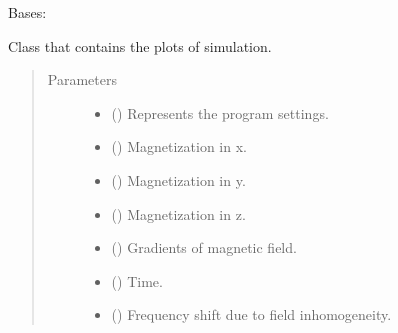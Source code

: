 \documentclass[a4paper,10pt,english]{sphinxmanual}
\begin{document}
\begin{fulllineitems}
\label{\detokenize{autodoc/mrsprint/mrsprint.simulator:mrsprint.simulator.plot.Plot}}
Bases: 

Class that contains the plots of simulation.
\begin{quote}\begin{description}
\item[{Parameters}] \leavevmode\begin{itemize}
\item {} 
 ({\hyperref[\detokenize{autodoc/mrsprint/mrsprint:mrsprint.settings.Settings}]{}}) \textendash{} Represents the program settings.

\item {} 
 () \textendash{} Magnetization in x.

\item {} 
 () \textendash{} Magnetization in y.

\item {} 
 () \textendash{} Magnetization in z.

\item {} 
 () \textendash{} Gradients of magnetic field.

\item {} 
 () \textendash{} Time.

\item {} 
 () \textendash{} Frequency shift due to field inhomogeneity.


\end{itemize}
\end{description}
\end{quote}
\end{fulllineitems}
\end{document}
